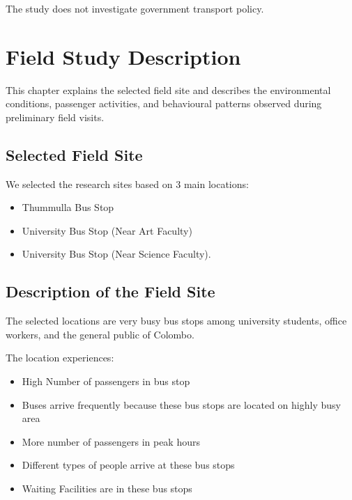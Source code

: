 \documentclass[12pt,a4paper]{report}
\begin{document}
The study does not investigate government transport policy.


\chapter{Field Study Description}

This chapter explains the selected field site and describes the environmental conditions,
passenger activities, and behavioural patterns observed during preliminary field visits.


\section{Selected Field Site}

We selected the research sites based on 3 main locations: 
\begin{itemize}[noitemsep]
\item Thummulla Bus Stop
\item University Bus Stop (Near Art Faculty)
\item University Bus Stop (Near Science Faculty).
\end{itemize}




\section{Description of the Field Site}

The selected locations are very busy bus stops among university students, office workers, and the general public of Colombo.

The location experiences:

\begin{itemize}[noitemsep]

\item High Number of passengers in bus stop

\item Buses arrive frequently because these bus stops are located on highly busy area

\item More number of passengers in peak hours

\item Different types of people arrive at these bus stops


\item Waiting Facilities are in these bus stops




\end{itemize}
\end{document}

